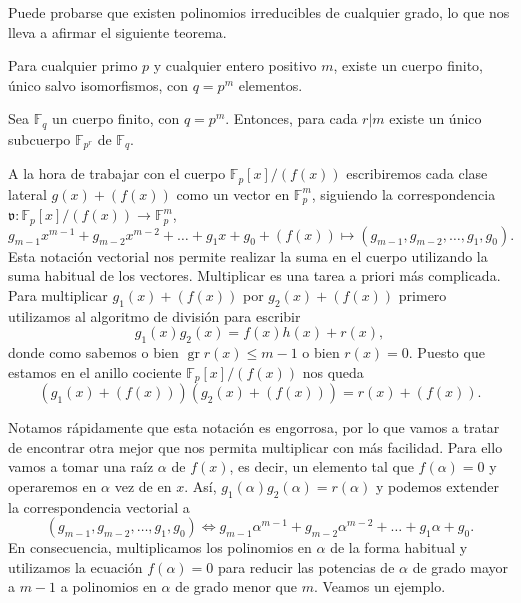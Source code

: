 Puede probarse que existen polinomios irreducibles de cualquier grado, lo que nos lleva a afirmar el siguiente teorema.

\begin{theorem}
  Para cualquier primo \(p\) y cualquier entero positivo \(m\), existe un cuerpo finito, único salvo isomorfismos, con \(q = p^m\) elementos.
\end{theorem}

\begin{proposition}
  \label{prop:subcuerpo-divisor-m}
  Sea \(\mathbb F_{q}\) un cuerpo finito, con \(q = p^m\).
  Entonces, para cada \(r | m\) existe un único subcuerpo \(\mathbb F_{p^r}\) de \(\mathbb F_q\).
\end{proposition}

A la hora de trabajar con el cuerpo \(\mathbb F_p[x]/(f(x))\) escribiremos cada clase lateral \(g(x) + (f(x))\) como un vector en \(\mathbb F_p^m\), siguiendo la correspondencia \(\mathfrak v : \mathbb F_p[x]/(f(x)) \to \mathbb F_p^m\),
\[
  g_{m-1}x^{m-1} + g_{m-2}x^{m-2}+ \dots + g_1x + g_0 + (f(x)) \mapsto (g_{m-1},g_{m-2}, \dots, g_1, g_0).
\]
Esta notación vectorial nos permite realizar la suma en el cuerpo utilizando la suma habitual de los vectores.
Multiplicar es una tarea a priori más complicada.
Para multiplicar \(g_1(x) + (f(x))\) por \(g_2(x) + (f(x))\) primero utilizamos al algoritmo de división para escribir
\[
  g_1(x)g_2(x) = f(x)h(x) + r(x),
\]
donde como sabemos o bien \(\operatorname{gr} r(x) \leq m -1\) o bien \(r(x) = 0\).
Puesto que estamos en el anillo cociente \(\mathbb F_p[x]/(f(x))\) nos queda
\[
  (g_1(x) + (f(x)))(g_2(x) + (f(x))) = r(x) + (f(x)).
\]

Notamos rápidamente que esta notación es engorrosa, por lo que vamos a tratar de encontrar otra mejor que nos permita multiplicar con más facilidad.
Para ello vamos a tomar una raíz \(\alpha\) de \(f(x)\), es decir, un elemento tal que \(f(\alpha) = 0\) y operaremos en \(\alpha\) vez de en \(x\).
Así, \(g_1(\alpha)g_2(\alpha) = r(\alpha)\) y podemos extender la correspondencia vectorial a
\[
  (g_{m-1}, g_{m-2}, \dots, g_1, g_0) \iff g_{m-1}\alpha^{m-1} + g_{m-2}\alpha^{m-2}+ \dots + g_1\alpha + g_0.
\]
En consecuencia, multiplicamos los polinomios en \(\alpha\) de la forma habitual y utilizamos la ecuación \(f(\alpha) = 0\) para reducir las potencias de \(\alpha\) de grado mayor a \(m-1\) a polinomios en \(\alpha\) de grado menor que \(m\).
Veamos un ejemplo.

